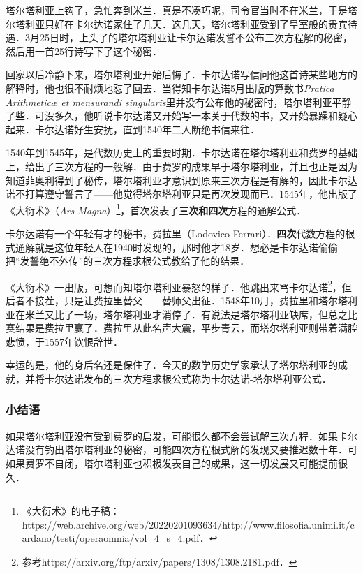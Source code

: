 塔尔塔利亚上钩了，急忙奔到米兰．真是不凑巧呢，司令官当时不在米兰，于是塔尔塔利亚只好在卡尔达诺家住了几天．这几天，塔尔塔利亚受到了皇室般的贵宾待遇．3月25日时，上头了的塔尔塔利亚让卡尔达诺发誓不公布三次方程解的秘密，然后用一首25行诗写下了这个秘密．

回家以后冷静下来，塔尔塔利亚开始后悔了．卡尔达诺写信问他这首诗某些地方的解释时，他也很不耐烦地怼了回去．当得知卡尔达诺5月出版的算数书\textsl{Pratica Arithmeticæ et mensurandi singularis}里并没有公布他的秘密时，塔尔塔利亚平静了些．可没多久，他听说卡尔达诺又开始写一本关于代数的书，又开始暴躁和疑心起来．卡尔达诺好生安抚，直到1540年二人断绝书信来往．

1540年到1545年，是代数历史上的重要时期．卡尔达诺在塔尔塔利亚和费罗的基础上，给出了三次方程的一般解．由于费罗的成果早于塔尔塔利亚，并且也正是因为知道菲奥利得到了秘传，塔尔塔利亚才意识到原来三次方程是有解的，因此卡尔达诺不打算遵守誓言了——他觉得塔尔塔利亚只是再次发现而已．1545年，他出版了《大衍术》（\textsl{Ars Magna}）\footnote{《大衍术》的电子稿：https://web.archive.org/web/20220201093634/http://www.filosofia.unimi.it/cardano/testi/operaomnia/vol_4_s_4.pdf．}，首次发表了\textbf{三次和四次}方程的通解公式．

卡尔达诺有一个年轻有才的秘书，费拉里（Lodovico Ferrari）．\textbf{四次}代数方程的根式通解就是这位年轻人在1940时发现的，那时他才18岁．想必是卡尔达诺偷偷把“发誓绝不外传”的三次方程求根公式教给了他的结果．

《大衍术》一出版，可想而知塔尔塔利亚暴怒的样子．他跳出来骂卡尔达诺\footnote{参考https://arxiv.org/ftp/arxiv/papers/1308/1308.2181.pdf．}，但后者不接茬，只是让费拉里替父——替师父出征．1548年10月，费拉里和塔尔塔利亚在米兰又比了一场，塔尔塔利亚才消停了．有说法是塔尔塔利亚缺席，但总之比赛结果是费拉里赢了．费拉里从此名声大震，平步青云，而塔尔塔利亚则带着满腔悲愤，于1557年饮恨辞世．

幸运的是，他的身后名还是保住了．今天的数学历史学家承认了塔尔塔利亚的成就，并将卡尔达诺发布的三次方程求根公式称为卡尔达诺-塔尔塔利亚公式．






\subsubsection{小结语}

如果塔尔塔利亚没有受到费罗的启发，可能很久都不会尝试解三次方程．如果卡尔达诺没有钓出塔尔塔利亚的秘密，可能四次方程根式解的发现又要推迟数十年．可如果费罗不自闭，塔尔塔利亚也积极发表自己的成果，这一切发展又可能提前很久．

